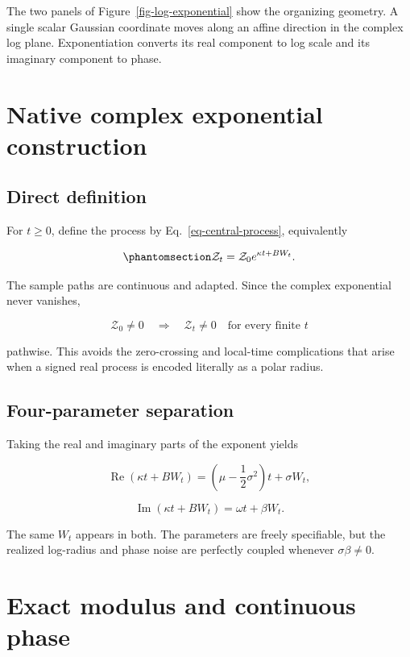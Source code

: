 \documentclass[
  english,
  10pt,
  letterpaper,
  DIV=11,
  numbers=noendperiod]{scrartcl}
\begin{document}
The two panels of Figure~\ref{fig-log-exponential} show the organizing
geometry. A single scalar Gaussian coordinate moves along an affine
direction in the complex log plane. Exponentiation converts its real
component to log scale and its imaginary component to phase.

\section{Native complex exponential
construction}\label{sec-construction}

\subsection{Direct definition}\label{direct-definition}

For \(t\ge0\), define the process by Eq.~\ref{eq-central-process},
equivalently

\begin{equation}\protect\phantomsection\label{eq-native-short}{
\mathcal Z_t=\mathcal Z_0e^{\kappa t+BW_t}.
}\end{equation}

The sample paths are continuous and adapted. Since the complex
exponential never vanishes,

\[
\mathcal Z_0\ne0
\quad\Longrightarrow\quad
\mathcal Z_t\ne0
\quad\text{for every finite }t
\]

pathwise. This avoids the zero-crossing and local-time complications
that arise when a signed real process is encoded literally as a polar
radius.

\subsection{Four-parameter separation}\label{four-parameter-separation}

Taking the real and imaginary parts of the exponent yields

\[
\operatorname{Re}(\kappa t+BW_t)
=
\left(\mu-\frac12\sigma^2\right)t+\sigma W_t,
\]

\[
\operatorname{Im}(\kappa t+BW_t)
=
\omega t+\beta W_t.
\]

The same \(W_t\) appears in both. The parameters are freely specifiable,
but the realized log-radius and phase noise are perfectly coupled
whenever \(\sigma\beta\ne0\).

\section{Exact modulus and continuous phase}\label{sec-modulus-phase}
\end{document}
